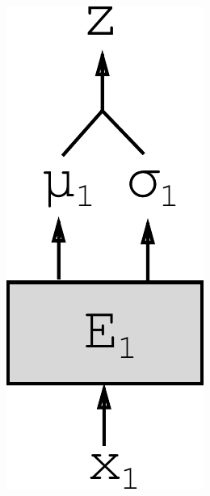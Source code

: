 \documentclass{article}
\begin{document}
\begin{figure}[!h]
\begin{subfigure}[b]{.10\linewidth}
        \includegraphics[width=.75\linewidth]{modelv2}
        \caption{}
        \label{fig:diagram:modelv2}
    \end{subfigure}\hspace{5mm}
    \begin{subfigure}[b]{.10\linewidth}

\end{subfigure}
\end{figure}
\end{document}
